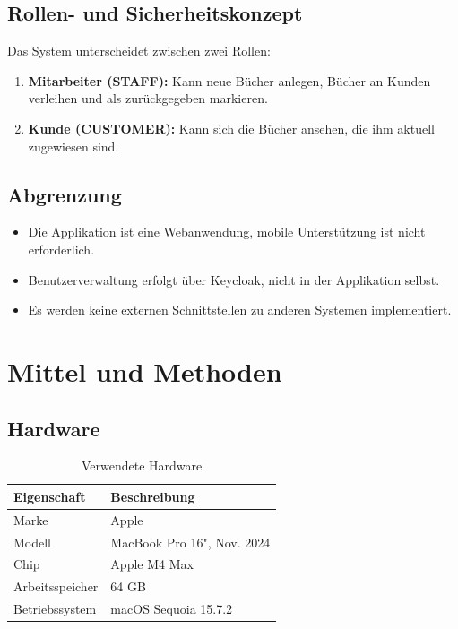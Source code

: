 \documentclass[a4paper,12pt,twoside]{report}
\begin{document}
\subsection{Rollen- und Sicherheitskonzept}
Das System unterscheidet zwischen zwei Rollen:
\begin{enumerate}
    \item \textbf{Mitarbeiter (STAFF):} Kann neue Bücher anlegen, Bücher an Kunden verleihen und als zurückgegeben markieren.
    \item \textbf{Kunde (CUSTOMER):} Kann sich die Bücher ansehen, die ihm aktuell zugewiesen sind.
\end{enumerate}

\subsection{Abgrenzung}
\begin{itemize}
    \item Die Applikation ist eine Webanwendung, mobile Unterstützung ist nicht erforderlich.
    \item Benutzerverwaltung erfolgt über Keycloak, nicht in der Applikation selbst.
    \item Es werden keine externen Schnittstellen zu anderen Systemen implementiert.
\end{itemize}

\newpage

\section{Mittel und Methoden}

\subsection{Hardware}

\begin{table}[H]
\centering
\caption{Verwendete Hardware}
\label{tab:hardware}
\begin{tabularx}{\textwidth}{l X}
\toprule
\textbf{Eigenschaft} & \textbf{Beschreibung} \\
\midrule
Marke & Apple \\
Modell & MacBook Pro 16", Nov. 2024 \\
Chip & Apple M4 Max \\
Arbeitsspeicher & 64 GB \\
Betriebssystem & macOS Sequoia 15.7.2 \\
\bottomrule
\end{tabularx}
\end{table}
\end{document}

